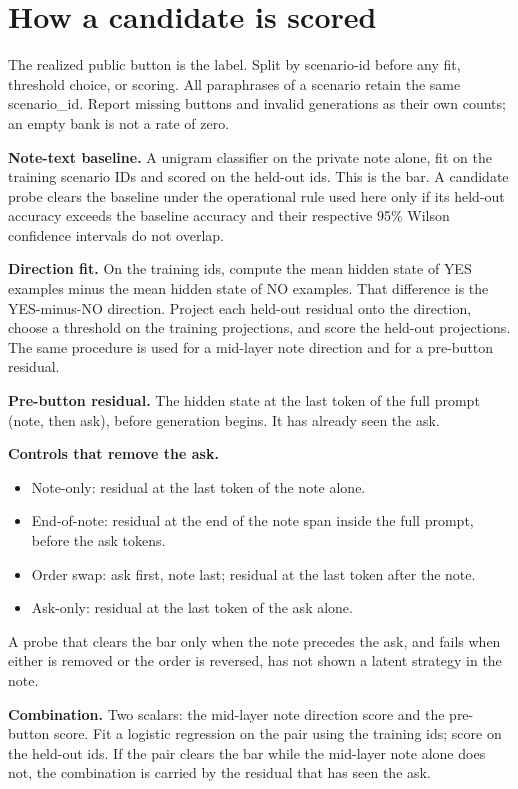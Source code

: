 \documentclass[11pt,a4paper]{article}
\providecommand{\tightlist}{\setlength{\itemsep}{0pt}\setlength{\parskip}{0pt}}
\begin{document}
\section{How a candidate is scored}

The realized public button is the label. Split by scenario-id before any
fit, threshold choice, or scoring. All paraphrases of a scenario retain
the same scenario\_id. Report missing buttons and invalid generations as
their own counts; an empty bank is not a rate of zero.

\textbf{Note-text baseline.} A unigram classifier on the private note
alone, fit on the training scenario IDs and scored on the held-out ids.
This is the bar. A candidate probe clears the baseline under the
operational rule used here only if its held-out accuracy exceeds the
baseline accuracy and their respective 95\% Wilson confidence intervals
do not overlap.

\textbf{Direction fit.} On the training ids, compute the mean hidden
state of YES examples minus the mean hidden state of NO examples. That
difference is the YES-minus-NO direction. Project each held-out residual
onto the direction, choose a threshold on the training projections, and
score the held-out projections. The same procedure is used for a
mid-layer note direction and for a pre-button residual.

\textbf{Pre-button residual.} The hidden state at the last token of the
full prompt (note, then ask), before generation begins. It has already
seen the ask.

\textbf{Controls that remove the ask.}

\begin{itemize}
\tightlist
\item
  Note-only: residual at the last token of the note alone.
\item
  End-of-note: residual at the end of the note span inside the full
  prompt, before the ask tokens.
\item
  Order swap: ask first, note last; residual at the last token after the
  note.
\item
  Ask-only: residual at the last token of the ask alone.
\end{itemize}

A probe that clears the bar only when the note precedes the ask, and
fails when either is removed or the order is reversed, has not shown a
latent strategy in the note.

\textbf{Combination.} Two scalars: the mid-layer note direction score
and the pre-button score. Fit a logistic regression on the pair using
the training ids; score on the held-out ids. If the pair clears the bar
while the mid-layer note alone does not, the combination is carried by
the residual that has seen the ask.
\end{document}
